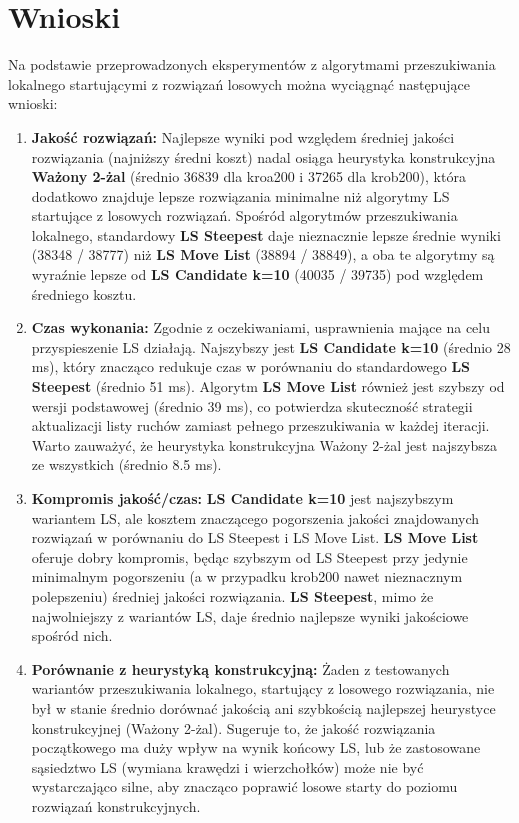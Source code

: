 \documentclass[12pt,a4paper]{article}
\begin{document}
\section{Wnioski}
Na podstawie przeprowadzonych eksperymentów z algorytmami przeszukiwania lokalnego startującymi z rozwiązań losowych można wyciągnąć następujące wnioski:

\begin{enumerate}
    \item \textbf{Jakość rozwiązań:} Najlepsze wyniki pod względem średniej jakości rozwiązania (najniższy średni koszt) nadal osiąga heurystyka konstrukcyjna \textbf{Ważony 2-żal} (średnio 36839 dla kroa200 i 37265 dla krob200), która dodatkowo znajduje lepsze rozwiązania minimalne niż algorytmy LS startujące z losowych rozwiązań. Spośród algorytmów przeszukiwania lokalnego, standardowy \textbf{LS Steepest} daje nieznacznie lepsze średnie wyniki (38348 / 38777) niż \textbf{LS Move List} (38894 / 38849), a oba te algorytmy są wyraźnie lepsze od \textbf{LS Candidate k=10} (40035 / 39735) pod względem średniego kosztu.

    \item \textbf{Czas wykonania:} Zgodnie z oczekiwaniami, usprawnienia mające na celu przyspieszenie LS działają. Najszybszy jest \textbf{LS Candidate k=10} (średnio 28 ms), który znacząco redukuje czas w porównaniu do standardowego \textbf{LS Steepest} (średnio 51 ms). Algorytm \textbf{LS Move List} również jest szybszy od wersji podstawowej (średnio 39 ms), co potwierdza skuteczność strategii aktualizacji listy ruchów zamiast pełnego przeszukiwania w każdej iteracji. Warto zauważyć, że heurystyka konstrukcyjna Ważony 2-żal jest najszybsza ze wszystkich (średnio 8.5 ms).

    \item \textbf{Kompromis jakość/czas:} \textbf{LS Candidate k=10} jest najszybszym wariantem LS, ale kosztem znaczącego pogorszenia jakości znajdowanych rozwiązań w porównaniu do LS Steepest i LS Move List. \textbf{LS Move List} oferuje dobry kompromis, będąc szybszym od LS Steepest przy jedynie minimalnym pogorszeniu (a w przypadku krob200 nawet nieznacznym polepszeniu) średniej jakości rozwiązania. \textbf{LS Steepest}, mimo że najwolniejszy z wariantów LS, daje średnio najlepsze wyniki jakościowe spośród nich.

    \item \textbf{Porównanie z heurystyką konstrukcyjną:} Żaden z testowanych wariantów przeszukiwania lokalnego, startujący z losowego rozwiązania, nie był w stanie średnio dorównać jakością ani szybkością najlepszej heurystyce konstrukcyjnej (Ważony 2-żal). Sugeruje to, że jakość rozwiązania początkowego ma duży wpływ na wynik końcowy LS, lub że zastosowane sąsiedztwo LS (wymiana krawędzi i wierzchołków) może nie być wystarczająco silne, aby znacząco poprawić losowe starty do poziomu rozwiązań konstrukcyjnych.


\end{enumerate}
\end{document}
